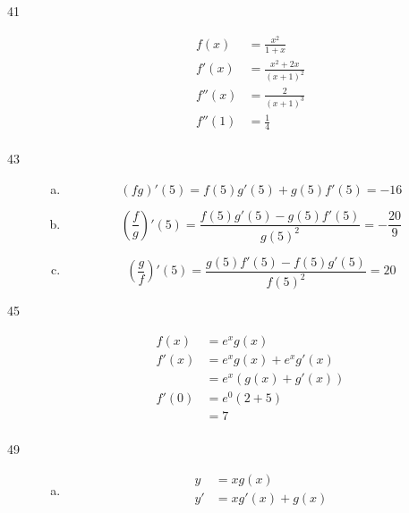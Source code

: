 \documentclass[letterpaper, landscape]{exam}
\begin{document}
\begin{description}
    \item[41]
      \begin{align*}
        f(x)   & = \frac{x^2}{1 + x} \\
        f'(x)  & = \frac{x^2 + 2x}{(x + 1)^2} \\
        f''(x) & = \frac{2}{(x + 1)^3} \\
        f''(1) & = \boxed{ \frac{1}{4} } \\
      \end{align*}

    \item[43]
      \begin{enumerate}[(a)]

        \item 
          \[
            (fg)'(5) = f(5)g'(5) + g(5)f'(5) = \boxed{ -16 }
          \]

        \item 
          \[
            \left( \frac{f}{g} \right)'(5) = \frac{f(5)g'(5) - g(5)f'(5)}{g(5)^2} 
              = \boxed{ - \frac{20}{9} }
          \]

        \item 
          \[
            \left( \frac{g}{f} \right)'(5) = \frac{g(5)f'(5) - f(5)g'(5)}{f(5)^2} = \boxed{ 20 }
          \]

      \end{enumerate}

    \item[45]
      \begin{align*}
        f(x)  & = e^x g(x) \\
        f'(x) & = e^x g(x) + e^x g'(x) \\
              & = e^x (g(x) + g'(x)) \\
        f'(0) & = e^0 ( 2 + 5 ) \\
              & = \boxed{ 7 } \\
      \end{align*}

    \item[49]
      \begin{enumerate}[(a)]

        \item 
          \begin{align*}
            y  & = x g(x) \\
            y' & = \boxed{ x g'(x) + g(x) } \\
          \end{align*}


\end{enumerate}
\end{description}
\end{document}
